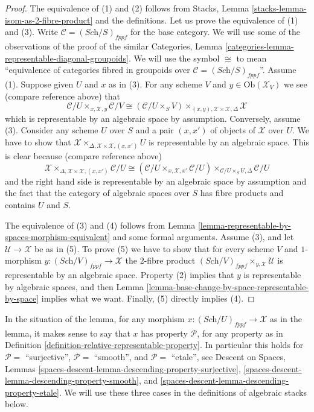 \begin{proof}
The equivalence of (1) and (2) follows from
Stacks, Lemma \ref{stacks-lemma-isom-as-2-fibre-product}
and the definitions.
Let us prove the equivalence of (1) and (3).
Write $\mathcal{C} = (\textit{Sch}/S)_{fppf}$ for the base category.
We will use some of the observations of the proof of the similar
Categories, Lemma \ref{categories-lemma-representable-diagonal-groupoids}.
We will use the symbol $\cong$ to mean ``equivalence of categories fibred
in groupoids over $\mathcal{C} = (\textit{Sch}/S)_{fppf}$''.
Assume (1). Suppose given $U$ and $x$ as in (3). For any scheme $V$
and $y \in \text{Ob}(\mathcal{X}_V)$ we see (compare reference above) that
$$
\mathcal{C}/U
\times_{x, \mathcal{X}, y}
\mathcal{C}/V
\cong
(\mathcal{C}/U\times_S V)
\times_{(x, y), \mathcal{X} \times \mathcal{X}, \Delta}
\mathcal{X}
$$
which is representable by an algebraic space by assumption. Conversely,
assume (3). Consider any scheme $U$ over $S$ and a pair $(x, x')$
of objects of $\mathcal{X}$ over $U$. We have to show that
$\mathcal{X} \times_{\Delta, \mathcal{X} \times \mathcal{X}, (x, x')} U$
is representable by an algebraic space. This is clear because
(compare reference above)
$$
\mathcal{X}
\times_{\Delta, \mathcal{X} \times \mathcal{X}, (x, x')}
\mathcal{C}/U
\cong
(\mathcal{C}/U \times_{x, \mathcal{X}, x'} \mathcal{C}/U)
\times_{\mathcal{C}/U \times_S U, \Delta}
\mathcal{C}/U
$$
and the right hand side is representable by an algebraic space by assumption
and the fact that the category of algebraic spaces over $S$ has fibre products
and contains $U$ and $S$.

\medskip\noindent
The equivalence of (3) and (4) follows from
Lemma \ref{lemma-representable-by-spaces-morphism-equivalent}
and some formal arguments.
Assume (3), and let $\mathcal{U} \to \mathcal{X}$ be as in (5).
To prove (5) we have to show that for every scheme $V$ and $1$-morphism
$y : (\textit{Sch}/V)_{fppf} \to \mathcal{X}$ the $2$-fibre product
$(\textit{Sch}/V)_{fppf} \times_{y, \mathcal{X}} \mathcal{U}$
is representable by an algebraic space. Property (2) implies
that $y$ is representable by algebraic spaces, and then
Lemma \ref{lemma-base-change-by-space-representable-by-space}
implies what we want. Finally, (5) directly implies (4).
\end{proof}

\noindent
In the situation of the lemma, for any morphism
$x : (\textit{Sch}/U)_{fppf} \to \mathcal{X}$ as in the lemma, it makes sense
to say that $x$ has property $\mathcal{P}$, for any property
as in Definition \ref{definition-relative-representable-property}.
In particular this holds for
$\mathcal{P} = $ ``surjective'',
$\mathcal{P} = $ ``smooth'', and
$\mathcal{P} = $ ``etale'',
see
Descent on Spaces,
Lemmas \ref{spaces-descent-lemma-descending-property-surjective},
\ref{spaces-descent-lemma-descending-property-smooth}, and
\ref{spaces-descent-lemma-descending-property-etale}.
We will use these three cases in the definitions
of algebraic stacks below. 










